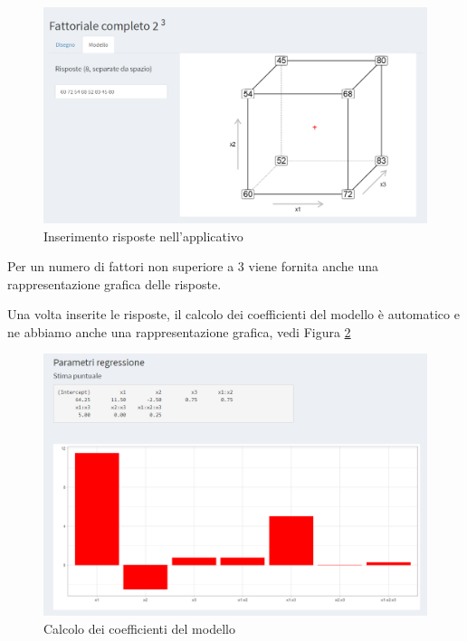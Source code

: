 \documentclass[
  11pt,
]{book}
\begin{document}
\begin{figure}

{\centering \includegraphics[width=1\linewidth]{Immagini/Fatt_compl/05_risp} 

}

\caption{Inserimento risposte nell'applicativo}\label{fig:fc5}
\end{figure}

Per un numero di fattori non superiore a 3 viene fornita anche una
rappresentazione grafica delle risposte.

Una volta inserite le risposte, il calcolo dei coefficienti del modello
è automatico e ne abbiamo anche una rappresentazione grafica, vedi
Figura \ref{fig:fc6}

\begin{figure}

{\centering \includegraphics[width=1\linewidth]{Immagini/Fatt_compl/06_coeff} 

}

\caption{Calcolo dei coefficienti del modello}\label{fig:fc6}
\end{figure}
\end{document}
